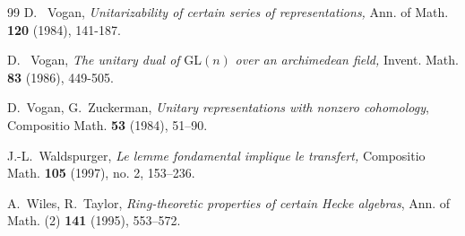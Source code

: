 \documentclass[12pt]{amsart}
\theoremstyle{definition}
\begin{document}
\begin{thebibliography}{99}
D. ~Vogan, \textit{Unitarizability of certain series of representations,} Ann. of Math. \textbf{120} (1984),
141-187. 

D. ~Vogan, \textit{The unitary dual of} GL$(n)$ \textit{over an archimedean field,} Invent. Math. \textbf{83} (1986),
449-505.

D.~Vogan, G.~Zuckerman, \textit{Unitary representations with nonzero cohomology}, {Compositio Math.} \textbf{53} (1984), 51--90.

J.-L.~Waldspurger,  \textit{Le lemme fondamental implique le transfert,} Compositio Math. \textbf{105}
(1997), no. 2, 153–236.


A.~Wiles, R.~Taylor, \textit{Ring-theoretic properties of certain Hecke algebras}, {Ann. of Math. (2)} \textbf{141} (1995), 553--572.

\end{thebibliography}
\end{document}
